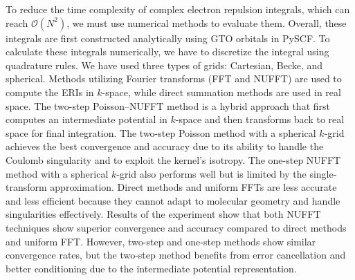 \documentclass[12pt,a4paper]{article}
\begin{document}
To reduce the time complexity of complex electron repulsion integrals, which can reach $\mathcal{O}(N^2)$, we must use numerical methods to evaluate them. Overall, these integrals are first constructed analytically using GTO orbitals in PySCF. To calculate these integrals numerically, we have to discretize the integral using quadrature rules. We have used three types of grids: Cartesian, Becke, and spherical. Methods utilizing Fourier transforms (FFT and NUFFT) are used to compute the ERIs in $k$-space, while direct summation methods are used in real space. The two-step Poisson--NUFFT method is a hybrid approach that first computes an intermediate potential in $k$-space and then transforms back to real space for final integration. The two-step Poisson method with a spherical $k$-grid achieves the best convergence and accuracy due to its ability to handle the Coulomb singularity and to exploit the kernel's isotropy. The one-step NUFFT method with a spherical $k$-grid also performs well but is limited by the single-transform approximation. Direct methods and uniform FFTs are less accurate and less efficient because they cannot adapt to molecular geometry and handle singularities effectively. Results of the experiment show that both NUFFT techniques show superior convergence and accuracy compared to direct methods and uniform FFT. However, two-step and one-step methods show similar convergence rates, but the two-step method benefits from error cancellation and better conditioning due to the intermediate potential representation.

\nocite{*}
\renewcommand{\bibname}{References}
\printbibliography[heading=bibintoc]
\end{document}
